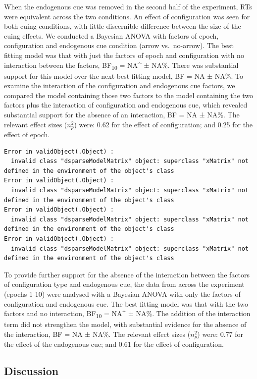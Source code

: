 \documentclass[
  man,
  floatsintext,
  longtable,
  nolmodern,
  notxfonts,
  notimes,
  colorlinks=true,linkcolor=blue,citecolor=blue,urlcolor=blue]{apa7}
\begin{document}
When the endogenous cue was removed in the second half of the
experiment, RTs were equivalent across the two conditions. An effect of
configuration was seen for both cuing conditions, with little
discernible difference between the size of the cuing effects. We
conducted a Bayesian ANOVA with factors of epoch, configuration and
endogenous cue condition (arrow vs.~no-arrow). The best fitting model
was that with just the factors of epoch and configuration with no
interaction between the factors, BF\textsubscript{10} = NA\^{} ± NA\%.
There was substantial support for this model over the next best fitting
model, BF = NA ± NA\%. To examine the interaction of the configuration
and endogenous cue factors, we compared the model containing those two
factors to the model containing the two factors plus the interaction of
configuration and endogenous cue, which revealed substantial support for
the absence of an interaction, BF = NA ± NA\%. The relevant effect sizes
(\(n^2_p\)) were: 0.62 for the effect of configuration; and 0.25 for the
effect of epoch.

\begin{verbatim}
Error in validObject(.Object) : 
  invalid class "dsparseModelMatrix" object: superclass "xMatrix" not defined in the environment of the object's class
Error in validObject(.Object) : 
  invalid class "dsparseModelMatrix" object: superclass "xMatrix" not defined in the environment of the object's class
Error in validObject(.Object) : 
  invalid class "dsparseModelMatrix" object: superclass "xMatrix" not defined in the environment of the object's class
Error in validObject(.Object) : 
  invalid class "dsparseModelMatrix" object: superclass "xMatrix" not defined in the environment of the object's class
\end{verbatim}

To provide further support for the absence of the interaction between
the factors of configuration type and endogenous cue, the data from
across the experiment (epochs 1-10) were analysed with a Bayesian ANOVA
with only the factors of configuration and endogenous cue. The best
fitting model was that with the two factors and no interaction,
BF\textsubscript{10} = NA\^{} ± NA\%. The addition of the interaction
term did not strengthen the model, with substantial evidence for the
absence of the interaction, BF = NA ± NA\%. The relevant effect sizes
(\(n^2_p\)) were: 0.77 for the effect of the endogenous cue; and 0.61
for the effect of configuration.

\subsection{Discussion}\label{discussion-1}
\end{document}
